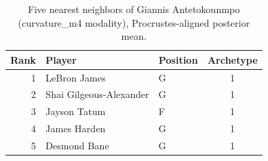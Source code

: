 \begin{table}[htbp]
  \centering\small
  \begin{tabular}{rllc}
    \toprule
    Rank & Player & Position & Archetype \\
    \midrule
    1 & LeBron James & G & 1 \\
    2 & Shai Gilgeous-Alexander & G & 1 \\
    3 & Jayson Tatum & F & 1 \\
    4 & James Harden & G & 1 \\
    5 & Desmond Bane & G & 1 \\
    \bottomrule
  \end{tabular}
  \caption{Five nearest neighbors of Giannis Antetokounmpo (curvature_m4 modality), Procrustes-aligned posterior mean.}
  \label{tab:Giannis_Antetokounmpo_neighbors_curvature_m4}
\end{table}

